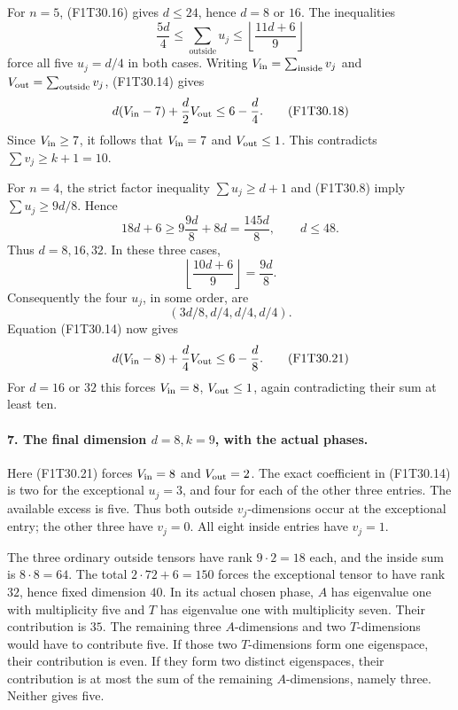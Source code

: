 For \(n=5\), (F1T30.16) gives \(d\le24\), hence
\(d=8\) or \(16\). The inequalities
\[
 \frac{5d}{4}\le\sum_{\mathrm{outside}}u_j
                \le\left\lfloor\frac{11d+6}{9}\right\rfloor
\]
force all five \(u_j=d/4\) in both cases.
Writing \(V_{\rm in}=\sum_{\mathrm{inside}}v_j\)
and \(V_{\rm out}=\sum_{\mathrm{outside}}v_j\),
(F1T30.14) gives
\[
 d(V_{\rm in}-7)+\frac d2V_{\rm out}
                                      \le6-\frac d4.
 \tag{F1T30.18}
\]
Since \(V_{\rm in}\ge7\), it follows that
\(V_{\rm in}=7\) and \(V_{\rm out}\le1\).
This contradicts \(\sum v_j\ge k+1=10\).

For \(n=4\), the strict factor inequality
\(\sum u_j\ge d+1\) and (F1T30.8) imply
\(\sum u_j\ge9d/8\). Hence
\[
             18d+6\ge9\frac{9d}{8}+8d
                         =\frac{145d}{8},\qquad d\le48.
 \tag{F1T30.19}
\]
Thus \(d=8,16,32\). In these three cases,
\[
 \left\lfloor\frac{10d+6}{9}\right\rfloor=\frac{9d}{8}.
\]
Consequently the four \(u_j\), in some order, are
\[
                        (3d/8,d/4,d/4,d/4).
 \tag{F1T30.20}
\]
Equation (F1T30.14) now gives
\[
 d(V_{\rm in}-8)+\frac d4 V_{\rm out}
                                      \le6-\frac d8 .
 \tag{F1T30.21}
\]
For \(d=16\) or \(32\) this forces
\(V_{\rm in}=8\), \(V_{\rm out}\le1\), again
contradicting their sum at least ten.

\paragraph{7. The final dimension \(d=8,k=9\), with the actual phases.}
Here (F1T30.21) forces \(V_{\rm in}=8\) and
\(V_{\rm out}=2\).
The exact coefficient in (F1T30.14) is two for
the exceptional \(u_j=3\), and four for each of the
other three entries. The available excess is five.
Thus both outside \(v_j\)-dimensions occur at the
exceptional entry; the other three have \(v_j=0\).
All eight inside entries have \(v_j=1\).

The three ordinary outside tensors have rank
\(9\cdot2=18\) each, and the inside sum is \(8\cdot8=64\).
The total \(2\cdot72+6=150\) forces the exceptional
tensor to have rank \(32\), hence fixed dimension \(40\).
In its actual chosen phase, \(A\) has eigenvalue one
with multiplicity five and \(T\) has eigenvalue one
with multiplicity seven. Their contribution is \(35\).
The remaining three \(A\)-dimensions and two
\(T\)-dimensions would have to contribute five.
If those two \(T\)-dimensions form one eigenspace,
their contribution is even. If they form two
distinct eigenspaces, their contribution is at most
the sum of the remaining \(A\)-dimensions, namely three.
Neither gives five.

